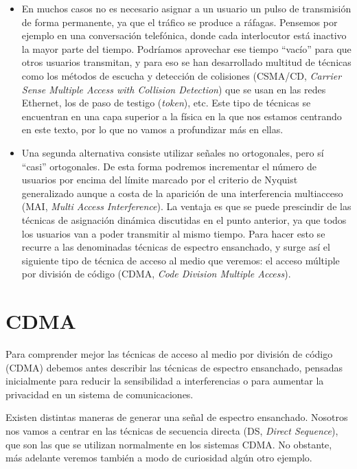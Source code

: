 \documentclass[es,apuntes]{uah}
\begin{document}
\begin{itemize}
	\item En muchos casos no es necesario asignar a un usuario un pulso de transmisión de forma permanente, ya que el tráfico se produce a ráfagas. Pensemos por ejemplo en una conversación telefónica, donde cada interlocutor está inactivo la mayor parte del tiempo. Podríamos aprovechar ese tiempo ``vacío'' para que otros usuarios transmitan, y para eso se han desarrollado multitud de técnicas como los métodos de escucha y detección de colisiones (CSMA/CD, \emph{Carrier Sense Multiple Access with Collision Detection}) que se usan en las redes Ethernet, los de paso de testigo (\emph{token}), etc. Este tipo de técnicas se encuentran en una capa superior a la física en la que nos estamos centrando en este texto, por lo que no vamos a profundizar más en ellas. 
	\item Una segunda alternativa consiste utilizar señales no ortogonales, pero sí ``casi'' ortogonales. De esta forma podremos incrementar el número de usuarios por encima del límite marcado por el criterio de Nyquist generalizado aunque a costa de la aparición de una interferencia multiacceso (MAI, \emph{Multi Access Interference}). La ventaja es que se puede prescindir de las técnicas de asignación dinámica discutidas en el punto anterior, ya que todos los usuarios van a poder transmitir al mismo tiempo. Para hacer esto se recurre a las denominadas técnicas de espectro ensanchado, y surge así el siguiente tipo de técnica de acceso al medio que veremos: el acceso múltiple por división de código (CDMA, \emph{Code Division Multiple Access}).
\end{itemize}

 

\section{CDMA}

Para comprender mejor las técnicas de acceso al medio por división de código (CDMA) debemos antes describir las técnicas de espectro ensanchado, pensadas inicialmente para reducir la sensibilidad a interferencias o para aumentar la privacidad en un sistema de comunicaciones. 

Existen distintas maneras de generar una señal de espectro ensanchado. Nosotros nos vamos a centrar en las técnicas de secuencia directa (DS, \emph{Direct Sequence}), que son las que se utilizan normalmente en los sistemas CDMA. No obstante, más adelante veremos también a modo de curiosidad algún otro ejemplo. 
\end{document}
